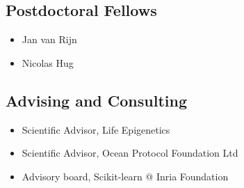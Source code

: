 \documentclass[a4paper,11pt]{article}
\begin{document}
\subsection{Postdoctoral Fellows}
\begin{itemize}
    \item Jan van Rijn
    \item Nicolas Hug
\end{itemize}
\subsection{Advising and Consulting}
\begin{itemize}
    \item Scientific Advisor, Life Epigenetics
    \item Scientific Advisor, Ocean Protocol Foundation Ltd
    \item Advisory board, Scikit-learn @ Inria Foundation
\end{itemize}
\begin{publications}
\end{publications}
\end{document}
